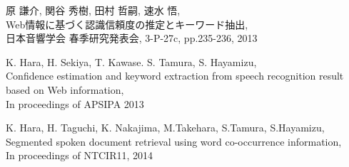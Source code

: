 %
\renewcommand{\bibname}{発表文献}
\begin{thebibliography}{99} %

原 謙介, 関谷 秀樹,  田村 哲嗣, 速水 悟, \\
Web情報に基づく認識信頼度の推定とキーワード抽出, \\
日本音響学会 春季研究発表会, 3-P-27c, pp.235-236, 2013 

K. Hara, H. Sekiya, T. Kawase. S. Tamura, S. Hayamizu, \\
Confidence estimation and keyword extraction from speech recognition result based on Web information, \\
In proceedings of APSIPA 2013

K. Hara, H. Taguchi, K. Nakajima, M.Takehara, S.Tamura, S.Hayamizu, \\
Segmented spoken document retrieval using word co-occurrence information, \\
In proceedings of NTCIR11, 2014

    
\end{thebibliography}
